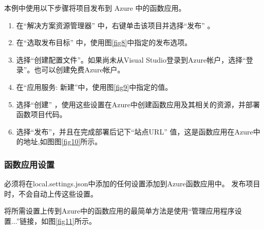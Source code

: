 \documentclass[11pt]{article}
\begin{document}
本例中使用以下步骤将项目发布到 Azure 中的函数应用。
\begin{enumerate}
	\item 在“解决方案资源管理器” 中，右键单击该项目并选择“发布” 。
	\item 在“选取发布目标” 中，使用图\ref{fig8}中指定的发布选项。
	\item 选择“创建配置文件”。如果尚未从Visual Studio登录到Azure帐户，选择“登录”。也可以创建免费Azure帐户。
	\item 在“应用服务: 新建”中，使用图\ref{fig9}中指定的值。
	\item 选择“创建” ，使用这些设置在Azure中创建函数应用及其相关的资源，并部署函数项目代码。
	\item 选择“发布”，并且在完成部署后记下“站点URL” 值，这是函数应用在Azure中的地址,如图图\ref{fig10}所示。
\end{enumerate}


\subsubsection{函数应用设置} 
必须将在local.settings.json中添加的任何设置添加到Azure函数应用中。 发布项目时，不会自动上传这些设置。

将所需设置上传到Azure中的函数应用的最简单方法是使用“管理应用程序设置...”链接，如图\ref{fig11}所示。
\end{document}

